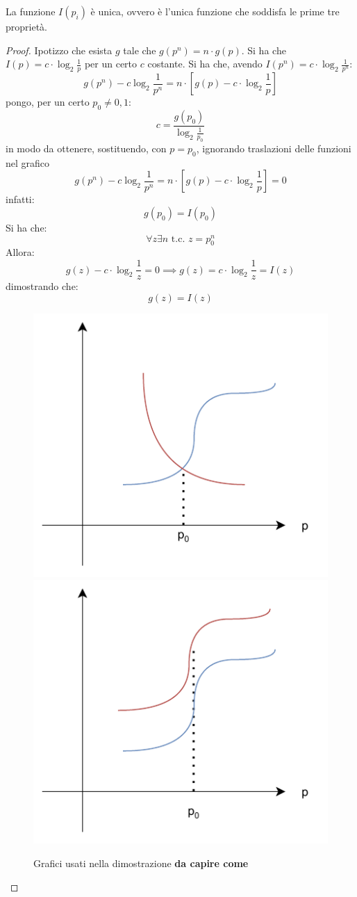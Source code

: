 \documentclass[a4paper,12pt, oneside]{book}
\begin{document}
\begin{teorema}
  La funzione $I(p_i)$ è unica, ovvero è l'unica funzione che soddisfa le prime
  tre proprietà. 
\end{teorema}
\begin{proof}
  Ipotizzo che esista $g$ tale che $g(p^n)=n\cdot g(p)$. Si ha che $I(p)=c\cdot
  \log_2\frac{1}{p}$ per un certo $c$ costante. Si ha che, avendo $I(p^n)=c\cdot
  \log_2\frac{1}{p^n}$:
  \[g(p^n)-c\log_2\frac{1}{p^n}=n\cdot[g(p)-c\cdot \log_2 \frac{1}{p}]\]
  pongo, per un certo $p_0\neq 0,1$:
  \[c=\frac{g(p_0)}{\log_2\frac{1}{p_0}}\]
  in modo da ottenere, sostituendo, con $p=p_0$, ignorando traslazioni delle
  funzioni nel grafico
  \[g(p^n)-c\log_2\frac{1}{p^n}=n\cdot[g(p)-c\cdot \log_2 \frac{1}{p}]=0\]
  infatti:
  \[g(p_0)=I(p_0)\]
  Si ha che:
  \[\forall z\exists n\mbox{ t.c. }z=p_0^n\]
  Allora:
  \[g(z)-c\cdot \log_2\frac{1}{z}=0\implies g(z)=c\cdot\log_2\frac{1}{z}=I(z)\]
  dimostrando che:
  \[g(z)=I(z)\]
  \begin{figure}[H]
    \centering
    \includegraphics[scale = 0.6]{img/grap2.pdf}
    \includegraphics[scale = 0.6]{img/grap3.pdf}
    \caption{Grafici usati nella dimostrazione \textbf{da capire come}}
  \end{figure}
\end{proof}
\end{document}
